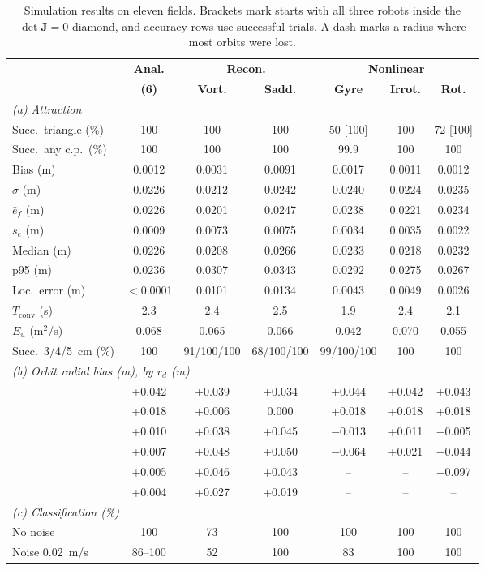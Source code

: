 \documentclass[lettersize,journal]{IEEEtran}
\newcommand{\rev}[1]{#1}
\begin{document}
\begin{table}[!t]
\scriptsize
\centering
\caption{Simulation results on eleven fields. Brackets mark starts with all three robots inside the $\det\mathbf{J} = 0$ diamond, and accuracy rows use successful trials. A dash marks a radius where most orbits were lost.}
\label{tab:simulation_results}
\setlength{\tabcolsep}{1.3pt}
\rev{\begin{tabular}{l|c|cc|ccc}
\hline
 & \textbf{Anal.} & \multicolumn{2}{c|}{\textbf{Recon.}} & \multicolumn{3}{c}{\textbf{Nonlinear}} \\
 & \textbf{(6)} & \textbf{Vort.} & \textbf{Sadd.} & \textbf{Gyre} & \textbf{Irrot.} & \textbf{Rot.} \\
\hline
\multicolumn{7}{l}{\textit{(a) Attraction}} \\
\hline
Succ.\ triangle (\%) & 100 & 100 & 100 & 50 [100] & 100 & 72 [100] \\
Succ.\ any c.p.\ (\%) & 100 & 100 & 100 & 99.9 & 100 & 100 \\
Bias (m) & 0.0012 & 0.0031 & 0.0091 & 0.0017 & 0.0011 & 0.0012 \\
$\sigma$ (m) & 0.0226 & 0.0212 & 0.0242 & 0.0240 & 0.0224 & 0.0235 \\
$\bar{e}_f$ (m) & 0.0226 & 0.0201 & 0.0247 & 0.0238 & 0.0221 & 0.0234 \\
$s_e$ (m) & 0.0009 & 0.0073 & 0.0075 & 0.0034 & 0.0035 & 0.0022 \\
Median (m) & 0.0226 & 0.0208 & 0.0266 & 0.0233 & 0.0218 & 0.0232 \\
p95 (m) & 0.0236 & 0.0307 & 0.0343 & 0.0292 & 0.0275 & 0.0267 \\
Loc.\ error (m) & $<$0.0001 & 0.0101 & 0.0134 & 0.0043 & 0.0049 & 0.0026 \\
$T_{\mathrm{conv}}$ (s) & 2.3 & 2.4 & 2.5 & 1.9 & 2.4 & 2.1 \\
$E_u$ (m$^2$/s) & 0.068 & 0.065 & 0.066 & 0.042 & 0.070 & 0.055 \\
Succ.\ 3/4/5~cm (\%) & 100 & 91/100/100 & 68/100/100 & 99/100/100 & 100 & 100 \\
\hline
\multicolumn{7}{l}{\textit{(b) Orbit radial bias (m), by $r_d$ (m)}} \\
\hline
\quad 0.01 & +0.042 & +0.039 & +0.034 & +0.044 & +0.042 & +0.043 \\
\quad 0.10 & +0.018 & +0.006 & 0.000 & +0.018 & +0.018 & +0.018 \\
\quad 0.20 & +0.010 & +0.038 & +0.045 & $-$0.013 & +0.011 & $-$0.005 \\
\quad 0.30 & +0.007 & +0.048 & +0.050 & $-$0.064 & +0.021 & $-$0.044 \\
\quad 0.40 & +0.005 & +0.046 & +0.043 & -- & -- & $-$0.097 \\
\quad 0.50 & +0.004 & +0.027 & +0.019 & -- & -- & -- \\
\hline
\multicolumn{7}{l}{\textit{(c) Classification (\%)}} \\
\hline
No noise & 100 & 73 & 100 & 100 & 100 & 100 \\
Noise 0.02~m/s & 86--100 & 52 & 100 & 83 & 100 & 100 \\
\hline
\end{tabular}}
\end{table}
\end{document}
